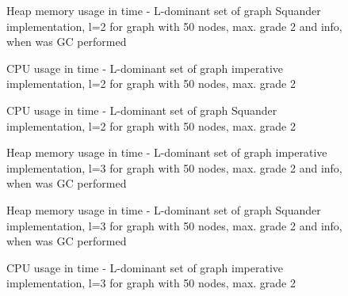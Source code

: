 \documentclass[11pt,twoside,a4paper]{book}
\begin{document}
\begin{figure}
\begin{center}

\caption{Heap memory usage in time - L-dominant set of graph Squander
implementation, l=2 for graph with 50 nodes, max. grade 2 and info, when was GC performed}
\label{fig:ldsgSMem5022}
\end{center}
\end{figure}


\begin{figure}
\begin{center}

\caption{CPU usage in time - L-dominant set of graph imperative
implementation, l=2 for graph with 50 nodes, max. grade 2}
\label{fig:ldsgICpu5022}
\end{center}
\end{figure}


\begin{figure}[ht]
\begin{center}

\caption{CPU usage in time - L-dominant set of graph Squander
implementation, l=2 for graph with 50 nodes, max. grade 2}
\label{fig:ldsgSCpu5022}
\end{center}
\end{figure}



\begin{figure}
\begin{center}

\caption{Heap memory usage in time - L-dominant set of graph imperative
implementation, l=3 for graph with 50 nodes, max. grade 2 and info, when was GC
performed}
\label{fig:ldsgIMem5023}
\end{center}
\end{figure}





\begin{figure}
\begin{center}

\caption{Heap memory usage in time - L-dominant set of graph Squander
implementation, l=3 for graph with 50 nodes, max. grade 2 and info, when was GC
performed}
\label{fig:ldsgSMem5023}
\end{center}
\end{figure}


\begin{figure}
\begin{center}

\caption{CPU usage in time - L-dominant set of graph imperative
implementation, l=3 for graph with 50 nodes, max. grade 2}
\label{fig:ldsgICpu5023}
\end{center}
\end{figure}
\end{document}
